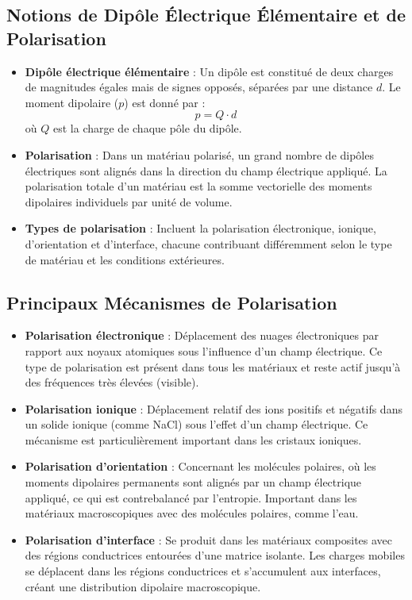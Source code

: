 \documentclass{article}
\begin{document}
    \subsection{Notions de Dipôle Électrique Élémentaire et de Polarisation}
    
    \begin{itemize}
        \item \textbf{Dipôle électrique élémentaire} : Un dipôle est constitué de deux charges de magnitudes égales mais de signes opposés, séparées par une distance $d$. Le moment dipolaire ($p$) est donné par :
        \[
        p = Q \cdot d
        \]
        où $Q$ est la charge de chaque pôle du dipôle.
        \item \textbf{Polarisation} : Dans un matériau polarisé, un grand nombre de dipôles électriques sont alignés dans la direction du champ électrique appliqué. La polarisation totale d'un matériau est la somme vectorielle des moments dipolaires individuels par unité de volume.
        \item \textbf{Types de polarisation} : Incluent la polarisation électronique, ionique, d'orientation et d'interface, chacune contribuant différemment selon le type de matériau et les conditions extérieures.
    \end{itemize}
    
    \subsection{Principaux Mécanismes de Polarisation}
    
    \begin{itemize}
        \item \textbf{Polarisation électronique} : Déplacement des nuages électroniques par rapport aux noyaux atomiques sous l'influence d'un champ électrique. Ce type de polarisation est présent dans tous les matériaux et reste actif jusqu'à des fréquences très élevées (visible).
        \item \textbf{Polarisation ionique} : Déplacement relatif des ions positifs et négatifs dans un solide ionique (comme NaCl) sous l'effet d'un champ électrique. Ce mécanisme est particulièrement important dans les cristaux ioniques.
        \item \textbf{Polarisation d'orientation} : Concernant les molécules polaires, où les moments dipolaires permanents sont alignés par un champ électrique appliqué, ce qui est contrebalancé par l'entropie. Important dans les matériaux macroscopiques avec des molécules polaires, comme l'eau.
        \item \textbf{Polarisation d'interface} : Se produit dans les matériaux composites avec des régions conductrices entourées d'une matrice isolante. Les charges mobiles se déplacent dans les régions conductrices et s'accumulent aux interfaces, créant une distribution dipolaire macroscopique.
    \end{itemize}
    
\end{document}
